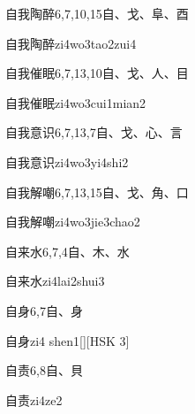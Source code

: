 \begin{entry}{自我陶醉}{6,7,10,15}{⾃、⼽、⾩、⾣}
  \begin{phonetics}{自我陶醉}{zi4wo3tao2zui4}
  \end{phonetics}
\end{entry}

\begin{entry}{自我催眠}{6,7,13,10}{⾃、⼽、⼈、⽬}
  \begin{phonetics}{自我催眠}{zi4wo3cui1mian2}
  \end{phonetics}
\end{entry}

\begin{entry}{自我意识}{6,7,13,7}{⾃、⼽、⼼、⾔}
  \begin{phonetics}{自我意识}{zi4wo3yi4shi2}
  \end{phonetics}
\end{entry}

\begin{entry}{自我解嘲}{6,7,13,15}{⾃、⼽、⾓、⼝}
  \begin{phonetics}{自我解嘲}{zi4wo3jie3chao2}
  \end{phonetics}
\end{entry}

\begin{entry}{自来水}{6,7,4}{⾃、⽊、⽔}
  \begin{phonetics}{自来水}{zi4lai2shui3}
  \end{phonetics}
\end{entry}

\begin{entry}{自身}{6,7}{⾃、⾝}
  \begin{phonetics}{自身}{zi4 shen1}[][HSK 3]
  \end{phonetics}
\end{entry}

\begin{entry}{自责}{6,8}{⾃、⾙}
  \begin{phonetics}{自责}{zi4ze2}
  \end{phonetics}
\end{entry}

